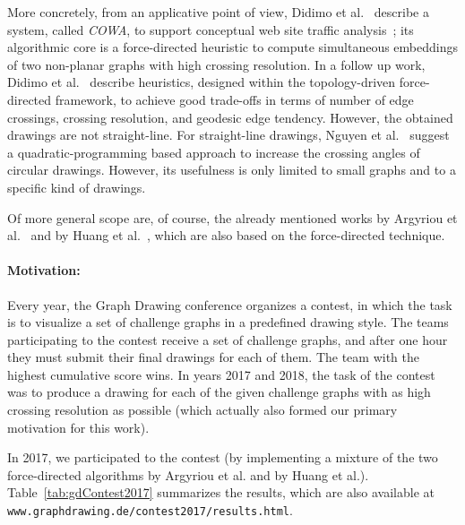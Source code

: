 \documentclass{comjnl}
\newcommand{\myparagraph}[1]{\medskip\noindent\textbf{#1}.}
\begin{document}
More concretely, from an applicative point of view, Didimo et al.~\cite{DBLP:conf/apvis/DidimoLR10} describe a system, called \emph{COWA},  to support conceptual web site traffic analysis~\cite{DBLP:conf/apvis/DidimoLR10}; its algorithmic core is a force-directed heuristic to compute simultaneous embeddings of two non-planar graphs with high crossing resolution.
%
In a follow up work, Didimo et al.~\cite{DBLP:conf/gd/DidimoLR10} describe heuristics, designed within the topology-driven force-directed framework, to achieve good trade-offs in terms of number of edge crossings, crossing resolution, and geodesic edge tendency.
%
However, the obtained drawings are not straight-line. For straight-line drawings, Nguyen et al.~\cite{DBLP:conf/gd/NguyenEHH10} suggest a quadratic-programming based approach to increase the crossing angles of circular drawings. However, its usefulness is only limited to small graphs and to a specific kind of drawings.

Of more general scope are, of course, the already mentioned works by Argyriou et al.~\cite{DBLP:journals/cj/ArgyriouBS13} and by Huang et al.~\cite{DBLP:journals/vlc/HuangEHL13}, which are also based on the force-directed technique.



\paragraph{Motivation:}


Every year, the Graph Drawing conference organizes a contest, in which the task is to visualize a set of challenge graphs in a predefined drawing style. The teams participating to the contest receive a set of challenge graphs, and after one hour they must submit their final drawings for each of them. The team with the highest cumulative score wins. In years 2017 and 2018, the task of the contest was to produce a drawing for each of the given challenge graphs with as high crossing resolution as possible (which actually also formed our primary motivation for this work). 

In 2017, we participated to the contest (by implementing a mixture of the two force-directed algorithms by Argyriou et al. and by Huang et al.). 
%
Table~\ref{tab:gdContest2017} summarizes the results, which are also available at \texttt{www.graphdrawing.de/contest2017/results.html}. 
\end{document}
